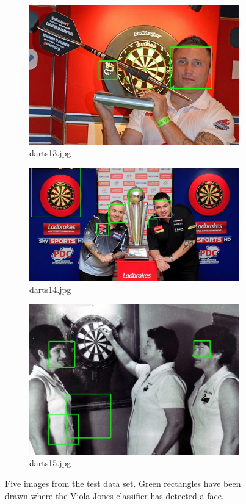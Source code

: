 \documentclass[conference]{IEEEtran}
\begin{document}
\begin{figure}[htb]
\begin{subfigure}{.5\linewidth}
  \centering
  \includegraphics[width=.9\linewidth]{images/detected2.jpg}
  \caption{darts13.jpg}
  \label{fig:sub1}
\end{subfigure}%
\begin{subfigure}{.5\linewidth}
  \centering
  \includegraphics[width=.9\linewidth]{images/detected3.jpg}
  \caption{darts14.jpg}
  \label{fig:sub2}
\end{subfigure}
\begin{subfigure}{.5\linewidth}
\centering
\includegraphics[width=0.9\linewidth]{images/detected4.jpg}
\caption{darts15.jpg}
\end{subfigure}


\caption{Five images from the test data set. Green rectangles have been drawn where the Viola-Jones classifier has detected a face. }
\label{fig:q13}
\end{figure}
\end{document}
